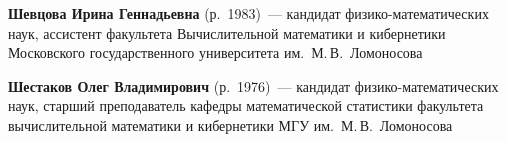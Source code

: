 \begin{multicols}{2}
\vspace*{6pt}

\noindent
\textbf{Шевцова Ирина Геннадьевна} (р.\ 1983)~--- кандидат физико-математических наук,
ассистент факультета Вычислительной математики и кибернетики Московского 
государственного университета им.\ М.\,В.~Ломоносова

\vspace*{6pt}

\noindent
\textbf{Шестаков Олег Владимирович} (р.\ 1976)~--- кандидат физико-математических наук,
старший преподаватель ка\-фед\-ры математической статистики факультета вычислительной математики и кибернетики
МГУ им.~М.\,В.~Ломоносова
\end{multicols}